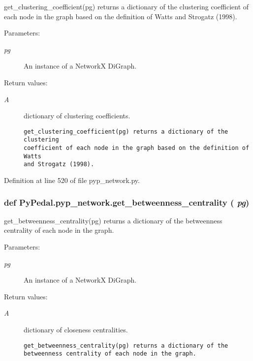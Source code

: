 get\_\-clustering\_\-coefficient(pg) returns a dictionary of the clustering coefficient of each node in the graph based on the definition of Watts and Strogatz (1998). 

\begin{Desc}
\item[Parameters:]
\begin{description}
\item[{\em pg}]An instance of a Network\-X Di\-Graph. \end{description}
\end{Desc}
\begin{Desc}
\item[Return values:]
\begin{description}
\item[{\em A}]dictionary of clustering coefficients.

\footnotesize\begin{verbatim}get_clustering_coefficient(pg) returns a dictionary of the clustering
coefficient of each node in the graph based on the definition of Watts
and Strogatz (1998).
\end{verbatim}
\normalsize
 \end{description}
\end{Desc}


Definition at line 520 of file pyp\_\-network.py.\hypertarget{namespacePyPedal_1_1pyp__network_802474b23ab95d5ef2421d61f2262b12}{
\subsubsection[get\_\-betweenness\_\-centrality]{\setlength{\rightskip}{0pt plus 5cm}def Py\-Pedal.pyp\_\-network.get\_\-betweenness\_\-centrality ( {\em pg})}}
\label{namespacePyPedal_1_1pyp__network_802474b23ab95d5ef2421d61f2262b12}


get\_\-betweenness\_\-centrality(pg) returns a dictionary of the betweenness centrality of each node in the graph. 

\begin{Desc}
\item[Parameters:]
\begin{description}
\item[{\em pg}]An instance of a Network\-X Di\-Graph. \end{description}
\end{Desc}
\begin{Desc}
\item[Return values:]
\begin{description}
\item[{\em A}]dictionary of closeness centralities.

\footnotesize\begin{verbatim}get_betweenness_centrality(pg) returns a dictionary of the
betweenness centrality of each node in the graph.
\end{verbatim}
\normalsize
 \end{description}
\end{Desc}


